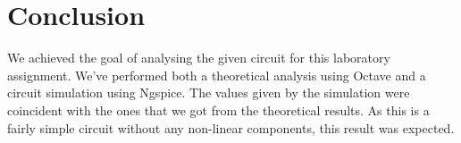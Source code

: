\section{Conclusion}
\label{sec:conclusion}

We achieved the goal of analysing the given circuit for this laboratory assignment. We've performed both a theoretical analysis using Octave and a circuit simulation using Ngspice. The values given by the simulation were coincident with the ones that we got from the theoretical results. As this is a fairly simple circuit without any non-linear components, this result was expected.
